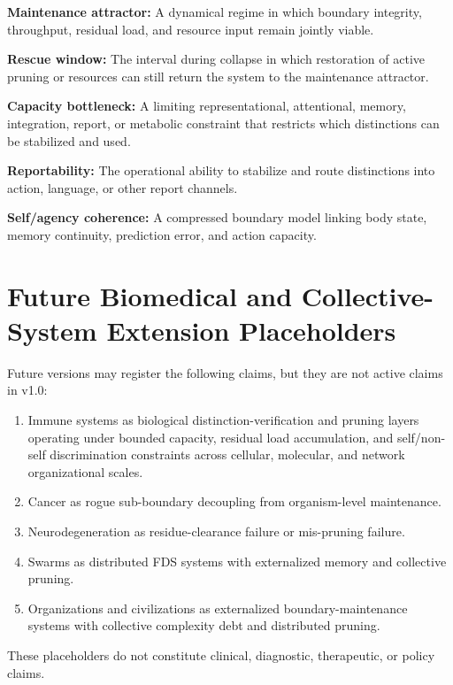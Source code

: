 \documentclass[10pt,a4paper,twocolumn,aps,prl]{revtex4-2}
\theoremstyle{claimstyle}
\theoremstyle{definition}
\newcommand{\FDS}{FDS}
\begin{document}
\textbf{Maintenance attractor:} A dynamical regime in which boundary integrity, throughput, residual load, and resource input remain jointly viable.

\textbf{Rescue window:} The interval during collapse in which restoration of active pruning or resources can still return the system to the maintenance attractor.

\textbf{Capacity bottleneck:} A limiting representational, attentional, memory, integration, report, or metabolic constraint that restricts which distinctions can be stabilized and used.

\textbf{Reportability:} The operational ability to stabilize and route distinctions into action, language, or other report channels.

\textbf{Self/agency coherence:} A compressed boundary model linking body state, memory continuity, prediction error, and action capacity.

\section{Future Biomedical and Collective-System Extension Placeholders}

Future versions may register the following claims, but they are not active claims in v1.0:
\begin{enumerate}
    \item {\raggedright Immune systems as biological distinction-verification and pruning layers operating under bounded capacity, residual load accumulation, and self/non-self discrimination constraints across cellular, molecular, and network organizational scales.\par}
    \item {\raggedright Cancer as rogue sub-boundary decoupling from organism-level maintenance.\par}
    \item {\raggedright Neurodegeneration as residue-clearance failure or mis-pruning failure.\par}
    \item {\raggedright Swarms as distributed \FDS{} systems with externalized memory and collective pruning.\par}
    \item {\raggedright Organizations and civilizations as externalized boundary-maintenance systems with collective complexity debt and distributed pruning.\par}
\end{enumerate}
These placeholders do not constitute clinical, diagnostic, therapeutic, or policy claims.
\end{document}
